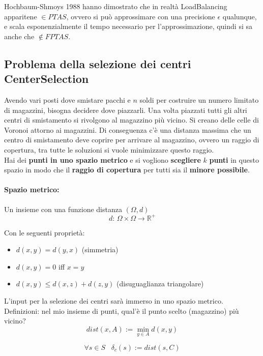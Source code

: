 Hochbaum-Shmoys 1988 hanno dimostrato che in realtà LoadBalancing apparitene $\in PTAS$, ovvero si può approssimare con una precisione $\epsilon$ qualunque, e scala esponenzialmente il tempo necessario per l'approssimazione, quindi si sa anche che $\notin FPTAS$.\\

\newpage

\subsection{Problema della selezione dei centri CenterSelection}
Avendo vari posti dove smistare pacchi e $n$ soldi per costruire un numero limitato di magazzini, bisogna decidere dove piazzarli. Una volta piazzati tutti gli altri centri di smistamento si rivolgono al magazzino più vicino. Si creano delle celle di Voronoi attorno ai magazzini. Di conseguenza c'è una distanza massima che un centro di smistamento deve coprire per arrivare al magazzino, ovvero un raggio di copertura, tra tutte le soluzioni si vuole minimizzare questo raggio.\\

Hai dei \textbf{punti in uno spazio metrico} e si vogliono \textbf{scegliere} $k$ \textbf{punti} in questo spazio in modo che il \textbf{raggio di copertura} per tutti sia il \textbf{minore possibile}.\\

\paragraph{Spazio metrico:} Un insieme con una funzione distanza $(\Omega, d)$ 
$$d: \, \Omega  \times \Omega \rightarrow \mathbb{R}^+$$

Con le seguenti proprietà:
\begin{itemize}
	\item $d(x,y) = d(y,x)$ (simmetria)
	\item $d(x,y) = 0$ iff $x=y$
	\item $d(x,y) \leq d(x,z) + d(z,y)$ (disuguaglianza triangolare)
\end{itemize}
L'input per la selezione dei centri sarà immerso in uno spazio metrico.\\

Definizioni: nel mio insieme di punti, qual'è il punto scelto (magazzino) più vicino?
$$ dist(x,A) := \min_{y \in A} d(x,y) $$

$$ \forall s \in S \;\;\; \delta_c (s) := dist(s,C)$$

